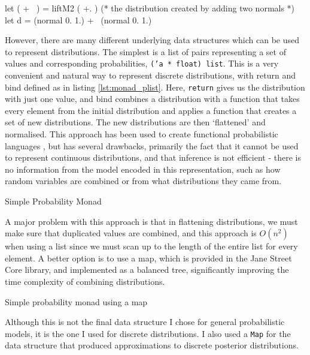 \begin{ocamlcode-in}
let ( +~ ) = liftM2 ( +. )
(* the distribution created by adding two normals *)
let d = (normal 0. 1.) +~ (normal 0. 1.)
\end{ocamlcode-in}

However, there are many different underlying data structures which can be used to represent distributions. The simplest is a list of pairs representing a set of values and corresponding probabilities, \texttt{('a * float) list}. This is a very convenient and natural way to represent discrete distributions, with return and bind defined as in listing \ref{lst:monad_plist}. Here, \texttt{return} gives us the distribution with just one value, and bind combines a distribution with a function that takes every element from the initial distribution and applies a function that creates a set of new distributions. The new distributions are then `flattened' and normalised. This approach has been used to create functional probabilistic languages \cite{erwig}, but has several drawbacks, primarily the fact that it cannot be used to represent continuous distributions, and that inference is not efficient - there is no information from the model encoded in this representation, such as how random variables are combined or from what distributions they came from.


\begin{listing}[!ht]
	\caption{Simple Probability Monad}
	\label{lst:monad_plist}
\end{listing}

A major problem with this approach is that in flattening distributions, we must make sure that duplicated values are combined, and this approach is $O(n^2)$ when using a list since we must scan up to the length of the entire list for every element. A better option is to use a map, which is provided in the Jane Street Core library, and implemented as a balanced tree, significantly improving the time complexity of combining distributions.

\begin{listing}[!ht]
	\caption{Simple probability monad using a map}
	\label{lst:monad_pmap}
\end{listing}

Although this is not the final data structure I chose for general probabilistic models, it is the one I used for discrete distributions. I also used a \texttt{Map} for the data structure that produced approximations to discrete posterior distributions.

